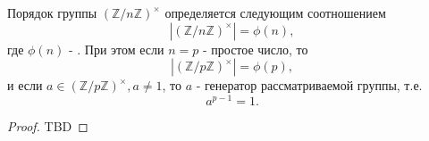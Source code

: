\begin{theorem}
Порядок группы $\left(\mathbb{Z}/n\mathbb{Z}\right)^\times$
определяется следующим соотношением
\[
\left|\left(\mathbb{Z}/n\mathbb{Z}\right)^\times\right| = \phi(n),
\]
где $\phi(n)$ - .
При этом если 
$n=p$ - простое число, то
\[
\left|\left(\mathbb{Z}/p\mathbb{Z}\right)^\times\right| = \phi(p),
\]
и если $a \in \left(\mathbb{Z}/p\mathbb{Z}\right)^\times, a \ne 1$,
то $a$ - генератор рассматриваемой группы, т.е.
\[
a^{p-1} = 1.
\]
\begin{proof}
TBD
\end{proof}
\label{thm:add:algebra:cyclic_mult_group}
\end{theorem}
